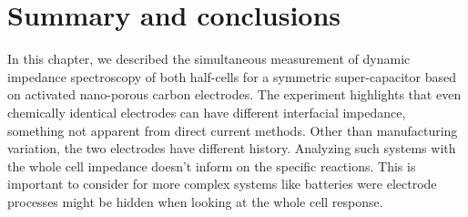 

\section{Summary and conclusions}
In this chapter, we described the simultaneous measurement of dynamic impedance spectroscopy of both half-cells for a symmetric super-capacitor based on activated nano-porous carbon electrodes.
The experiment highlights that even chemically identical electrodes can have different interfacial impedance, something not apparent from direct current methods.
Other than manufacturing variation, the two electrodes have different history. Analyzing such systems with the whole cell impedance doesn't inform on the specific reactions. This is important to consider for more complex systems like batteries were electrode processes might be hidden when looking at the whole cell response.















